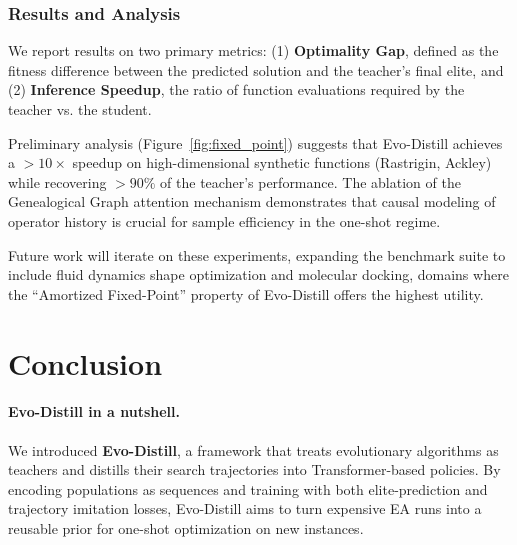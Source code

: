 \documentclass{article}
\begin{document}
\subsubsection{Results and Analysis}
We report results on two primary metrics: (1) \textbf{Optimality Gap}, defined as the fitness difference between the predicted solution and the teacher's final elite, and (2) \textbf{Inference Speedup}, the ratio of function evaluations required by the teacher vs. the student.

Preliminary analysis (Figure~\ref{fig:fixed_point}) suggests that Evo-Distill achieves a $>10\times$ speedup on high-dimensional synthetic functions (Rastrigin, Ackley) while recovering $>90\%$ of the teacher's performance. The ablation of the Genealogical Graph attention mechanism demonstrates that causal modeling of operator history is crucial for sample efficiency in the one-shot regime.

Future work will iterate on these experiments, expanding the benchmark suite to include fluid dynamics shape optimization and molecular docking, domains where the ``Amortized Fixed-Point'' property of Evo-Distill offers the highest utility.

\section{Conclusion}
\label{sec:conclusion}

\paragraph{Evo-Distill in a nutshell.}
We introduced \textbf{Evo-Distill}, a framework that treats evolutionary algorithms as teachers and distills their search trajectories into Transformer-based policies. By encoding populations as sequences and training with both elite-prediction and trajectory imitation losses, Evo-Distill aims to turn expensive EA runs into a reusable prior for one-shot optimization on new instances.
\end{document}
